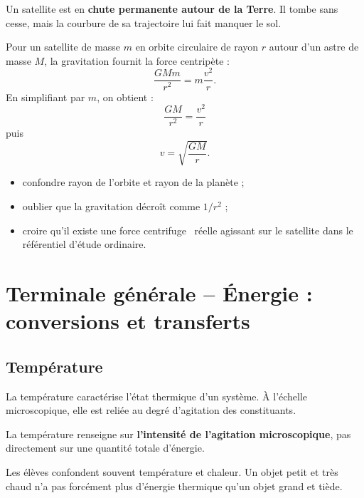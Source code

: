 \documentclass[11pt,a4paper]{article}
\begin{document}
\begin{imagem}
Un satellite est en \textbf{chute permanente autour de la Terre}.
Il tombe sans cesse, mais la courbure de sa trajectoire lui fait manquer le sol.
\end{imagem}

\begin{demo}
Pour un satellite de masse \(m\) en orbite circulaire de rayon \(r\) autour d'un astre de masse \(M\),
la gravitation fournit la force centripète :
\[
\frac{GMm}{r^2}=m\frac{v^2}{r}.
\]
En simplifiant par \(m\), on obtient :
\[
\frac{GM}{r^2}=\frac{v^2}{r}
\]
puis
\[
v=\sqrt{\frac{GM}{r}}.
\]
\end{demo}

\begin{erreurs}
\begin{itemize}
    \item confondre rayon de l'orbite et rayon de la planète ;
    \item oublier que la gravitation décroît comme \(1/r^2\) ;
    \item croire qu'il existe une force \og centrifuge \fg\ réelle agissant sur le satellite dans le référentiel d'étude ordinaire.
\end{itemize}
\end{erreurs}

\newpage

\section{Terminale générale -- Énergie : conversions et transferts}

\subsection{Température}

\begin{sens}
La température caractérise l'état thermique d'un système.
À l'échelle microscopique, elle est reliée au degré d'agitation des constituants.
\end{sens}

\begin{imagem}
La température renseigne sur \textbf{l'intensité de l'agitation microscopique},
pas directement sur une quantité totale d'énergie.
\end{imagem}

\begin{fausseintuition}
Les élèves confondent souvent température et chaleur.
Un objet petit et très chaud n'a pas forcément plus d'énergie thermique qu'un objet grand et tiède.
\end{fausseintuition}
\end{document}

